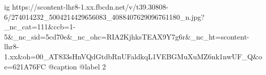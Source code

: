  
 
 
 
 

\ifcmt
  ig https://scontent-lhr8-1.xx.fbcdn.net/v/t39.30808-6/274014232_5004214429656083_4088407629096761180_n.jpg?_nc_cat=111&ccb=1-5&_nc_sid=5cd70e&_nc_ohc=RIA2KjhksTEAX9Y7g6r&_nc_ht=scontent-lhr8-1.xx&oh=00_AT833sHnVQdGtdbRnUFaldkqL1VEBGMuXuMZ6nk1nwUF_Q&oe=621A76FC
  @caption @label 2
\fi
